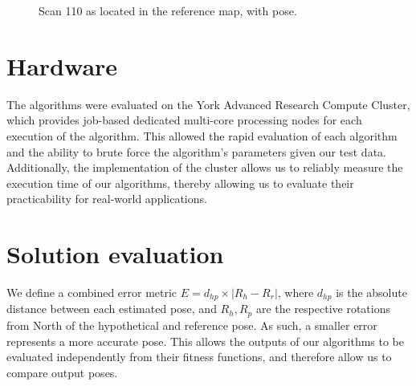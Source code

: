 \documentclass[authoryearcitations]{UoYCSproject}
\begin{document}
\begin{figure}[ht]
\centering

\begin{subfigure}[b]{0.4\textwidth}
\end{subfigure}
\caption{Scan 110 as located in the reference map, with pose.}
\label{fig:scan110}
\end{figure}

\section{Hardware}
The algorithms were evaluated on the York Advanced Research Compute Cluster, which provides job-based dedicated multi-core processing nodes for each execution of the algorithm. This allowed the rapid evaluation of each algorithm and the ability to brute force the algorithm's parameters given our test data. Additionally, the implementation of the cluster allows us to reliably measure the execution time of our algorithms, thereby allowing us to evaluate their practicability for real-world applications.

\section{Solution evaluation}
\label{sec:sol_eval}
We define a combined error metric $E=d_{hp}\times |R_h-R_r|$, where $d_{hp}$ is the absolute distance between each estimated pose, and $R_h, R_p$ are the respective rotations from North of the hypothetical and reference pose. As such, a smaller error represents a more accurate pose. This allows the outputs of our algorithms to be evaluated independently from their fitness functions, and therefore allow us to compare output poses. \newline
\end{document}
